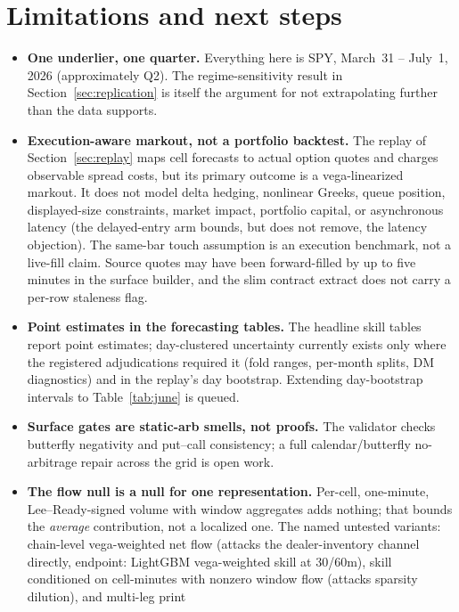 \documentclass[11pt]{article}
\begin{document}
\section{Limitations and next steps}
\label{sec:limits}

\begin{itemize}
  \item \textbf{One underlier, one quarter.} Everything here is SPY,
    March~31 -- July~1, 2026 (approximately Q2). The regime-sensitivity
    result in Section~\ref{sec:replication} is itself the argument for not
    extrapolating further than the data supports.
  \item \textbf{Execution-aware markout, not a portfolio backtest.} The
    replay of Section~\ref{sec:replay} maps cell forecasts to actual option
    quotes and charges observable spread costs, but its primary outcome is
    a vega-linearized markout. It does not model delta hedging, nonlinear
    Greeks, queue position, displayed-size constraints, market impact,
    portfolio capital, or asynchronous latency (the delayed-entry arm
    bounds, but does not remove, the latency objection). The same-bar touch
    assumption is an execution benchmark, not a live-fill claim. Source
    quotes may have been forward-filled by up to five minutes in the
    surface builder, and the slim contract extract does not carry a per-row
    staleness flag.
  \item \textbf{Point estimates in the forecasting tables.} The headline
    skill tables report point estimates; day-clustered uncertainty
    currently exists only where the registered adjudications required it
    (fold ranges, per-month splits, DM diagnostics) and in the replay's day
    bootstrap. Extending day-bootstrap intervals to
    Table~\ref{tab:june} is queued.
  \item \textbf{Surface gates are static-arb smells, not proofs.} The
    validator checks butterfly negativity and put--call consistency;
    a full calendar/butterfly no-arbitrage repair across the grid is open
    work.
  \item \textbf{The flow null is a null for one representation.} Per-cell,
    one-minute, Lee--Ready-signed volume with window aggregates adds
    nothing; that bounds the \emph{average} contribution, not a localized
    one. The named untested variants: chain-level vega-weighted net flow
    (attacks the dealer-inventory channel directly, endpoint: LightGBM
    vega-weighted skill at 30/60m), skill conditioned on cell-minutes with
    nonzero window flow (attacks sparsity dilution), and multi-leg print

\end{itemize}
\end{document}
